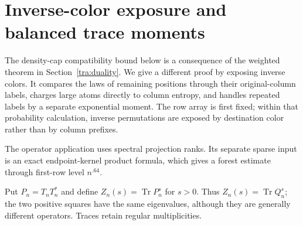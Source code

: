 \section{Inverse-color exposure and balanced trace moments}\label{tra:inverse-color}

The density-cap compatibility bound below is a consequence of the
weighted theorem in Section~\ref{tra:duality}. We give a different proof
by exposing inverse colors. It compares the laws of remaining positions
through their original-column labels, charges large atoms directly to
column entropy, and handles repeated labels by a separate exponential
moment. The row array is first fixed; within that probability calculation,
inverse permutations are exposed by destination color rather than by
column prefixes.

The operator application uses spectral projection ranks. Its separate
sparse input is an exact endpoint-kernel product formula, which gives
a forest estimate through first-row level $n^{.64}$.

Put $P_n=T_nT_n^*$ and define $Z_n(s)=\operatorname{Tr}P_n^s$ for $s>0$. Thus
$Z_n(s)=\operatorname{Tr}Q_n^s$; the two positive squares have the
same eigenvalues, although they are generally different operators.
Traces retain regular multiplicities.

